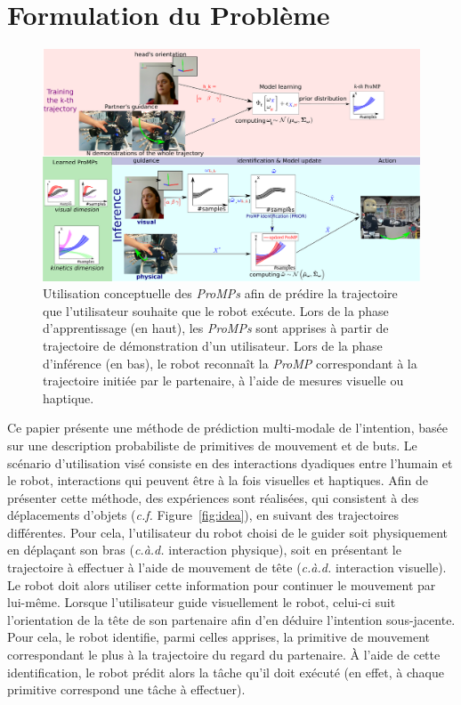 \documentclass[runningheads,a4paper]{llncs}
\begin{document}
\section{Formulation du Problème}
\label{sec:pblm}
\begin{figure}[t]
\centering
\includegraphics[width=\hsize]{figures/conceptualV2.pdf}
\caption{Utilisation conceptuelle des \textit{ProMPs} afin de prédire la trajectoire que l'utilisateur souhaite que le robot exécute. Lors de la phase d'apprentissage (en haut), les \textit{ProMPs} sont apprises à partir de trajectoire de démonstration d'un utilisateur. Lors de la phase d'inférence (en bas), le robot reconnaît la \textit{ProMP} correspondant à la trajectoire initiée par le partenaire, à l'aide de mesures visuelle ou haptique.}
\label{fig:conceptual}
\end{figure} 
Ce papier présente une méthode de prédiction multi-modale de l'intention, basée sur une description probabiliste de primitives de mouvement et de buts.
Le scénario d'utilisation visé consiste en des interactions dyadiques entre l'humain et le robot, interactions qui peuvent être à la fois visuelles et haptiques. Afin de présenter cette méthode, des expériences sont réalisées, qui consistent à des déplacements d'objets (\textit{c.f.} Figure~\ref{fig:idea}), en suivant des trajectoires différentes. 
Pour cela, l'utilisateur du robot choisi de le guider soit physiquement en déplaçant son bras (\textit{c.à.d.} interaction physique), soit en présentant le trajectoire à effectuer à l'aide de mouvement de tête (\textit{c.à.d.} interaction visuelle). Le robot doit alors utiliser cette information pour continuer le mouvement par lui-même.
Lorsque l'utilisateur guide visuellement le robot, celui-ci suit l'orientation de la tête de son partenaire afin d'en déduire l'intention sous-jacente. Pour cela, le robot identifie, parmi celles apprises, la primitive de mouvement correspondant le plus à la trajectoire du regard du partenaire. À l'aide de cette identification, le robot prédit alors la tâche qu'il doit exécuté (en effet, à chaque primitive correspond une tâche à effectuer).
\end{document}
